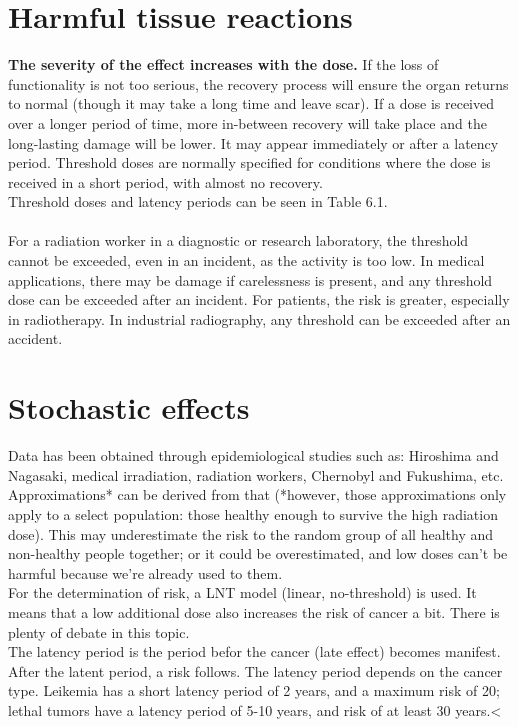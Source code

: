 \section{Harmful tissue reactions}
\textbf{The severity of the effect increases with the dose.} If the loss of functionality is not too serious, the recovery process will ensure the organ returns to normal (though it may take a long time and leave scar). If a dose is received over a longer period of time, more in-between recovery will take place and the long-lasting damage will be lower. It may appear immediately or after a latency period. Threshold doses are normally specified for conditions where the dose is received in a short period, with almost no recovery. \\
Threshold doses and latency periods can be seen in Table 6.1.\\\\
For a radiation worker in a diagnostic or research laboratory, the threshold cannot be exceeded, even in an incident, as the activity is too low. In medical applications, there may be damage if carelessness is present, and any threshold dose can be exceeded after an incident. For patients, the risk is greater, especially in radiotherapy. In industrial radiography, any threshold can be exceeded after an accident.
\section{Stochastic effects}
Data has been obtained through epidemiological studies such as: Hiroshima and Nagasaki, medical irradiation, radiation workers, Chernobyl and Fukushima, etc. Approximations* can be derived from that (*however, those approximations only apply to a select population: those healthy enough to survive the high radiation dose). This may underestimate the risk to the random group of all healthy and non-healthy people together; or it could be overestimated, and low doses can't be harmful because we're already used to them. \\
For the determination of risk, a LNT model (linear, no-threshold) is used. It means that a low additional dose also increases the risk of cancer a bit. There is plenty of debate in this topic.\\
The latency period is the period befor the cancer (late effect) becomes manifest. After the latent period, a risk follows. The latency period depends on the cancer type. Leikemia has a short latency period of 2 years, and a maximum risk of 20; lethal tumors have a latency period of 5-10 years, and risk of at least 30 years.<
